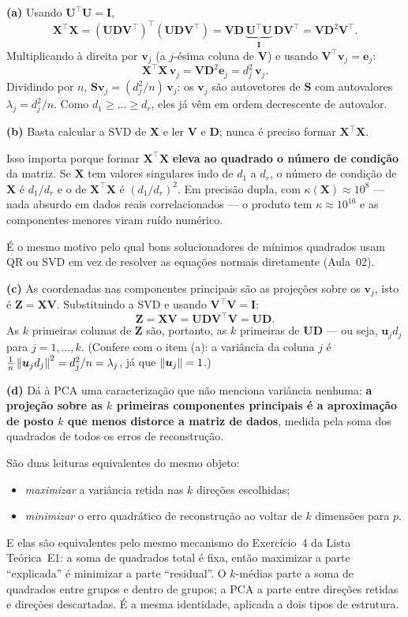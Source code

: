 \documentclass[11pt,a4paper]{article}
\begin{document}
\begin{solucao}
\textbf{(a)} Usando $\bm U^\top\bm U = \bm I$,
\[
  \bm X^\top\bm X = (\bm U\bm D\bm V^\top)^\top(\bm U\bm D\bm V^\top)
   = \bm V\bm D\,\underbrace{\bm U^\top\bm U}_{\bm I}\,\bm D\bm V^\top
   = \bm V\bm D^2\bm V^\top .
\]
Multiplicando à direita por $\bm v_j$ (a $j$-ésima coluna de $\bm V$) e usando
$\bm V^\top\bm v_j = \bm e_j$:
\[
  \bm X^\top\bm X\,\bm v_j = \bm V\bm D^2\bm e_j = d_j^2\,\bm v_j .
\]
Dividindo por $n$, $\bm S\bm v_j = (d_j^2/n)\,\bm v_j$: os $\bm v_j$ são
autovetores de $\bm S$ com autovalores $\lambda_j = d_j^2/n$. Como
$d_1\ge\dots\ge d_r$, eles já vêm em ordem decrescente de autovalor.

\smallskip
\textbf{(b)} Basta calcular a SVD de $\bm X$ e ler $\bm V$ e $\bm D$; nunca é
preciso formar $\bm X^\top\bm X$.

Isso importa porque formar $\bm X^\top\bm X$ \textbf{eleva ao quadrado o número
de condição} da matriz. Se $\bm X$ tem valores singulares indo de $d_1$ a $d_r$,
o número de condição de $\bm X$ é $d_1/d_r$ e o de $\bm X^\top\bm X$ é
$(d_1/d_r)^2$. Em precisão dupla, com $\kappa(\bm X)\approx 10^8$ --- nada
absurdo em dados reais correlacionados --- o produto tem $\kappa\approx 10^{16}$
e as componentes menores viram ruído numérico.

É o mesmo motivo pelo qual bons solucionadores de mínimos quadrados usam QR ou
SVD em vez de resolver as equações normais diretamente (Aula~02).

\smallskip
\textbf{(c)} As coordenadas nas componentes principais são as projeções sobre os
$\bm v_j$, isto é $\bm Z = \bm X\bm V$. Substituindo a SVD e usando
$\bm V^\top\bm V=\bm I$:
\[
  \bm Z = \bm X\bm V = \bm U\bm D\bm V^\top\bm V = \bm U\bm D .
\]
As $k$ primeiras colunas de $\bm Z$ são, portanto, as $k$ primeiras de
$\bm U\bm D$ --- ou seja, $\bm u_j d_j$ para $j=1,\dots,k$. (Confere com o item
(a): a variância da coluna $j$ é $\tfrac1n\left\lVert \bm u_j d_j \right\rVert^2 = d_j^2/n =
\lambda_j$, já que $\left\lVert \bm u_j \right\rVert=1$.)

\smallskip
\textbf{(d)} Dá à PCA uma caracterização que não menciona variância nenhuma:
\textbf{a projeção sobre as $k$ primeiras componentes principais é a
aproximação de posto $k$ que menos distorce a matriz de dados}, medida pela soma
dos quadrados de todos os erros de reconstrução.

São duas leituras equivalentes do mesmo objeto:
\begin{itemize}[leftmargin=1.4cm]
  \item \emph{maximizar} a variância retida nas $k$ direções escolhidas;
  \item \emph{minimizar} o erro quadrático de reconstrução ao voltar de $k$
        dimensões para $p$.
\end{itemize}
E elas são equivalentes pelo mesmo mecanismo do Exercício~4 da Lista Teórica~E1:
a soma de quadrados total é fixa, então maximizar a parte ``explicada'' é
minimizar a parte ``residual''. O $k$-médias parte a soma de quadrados entre
grupos e dentro de grupos; a PCA a parte entre direções retidas e direções
descartadas. É a mesma identidade, aplicada a dois tipos de estrutura.
\end{solucao}
\end{document}
